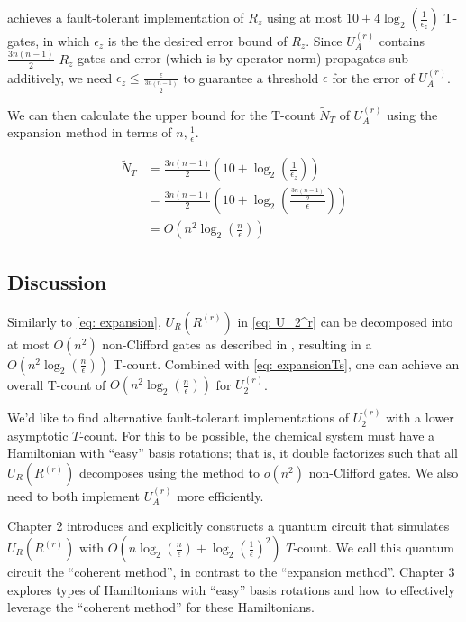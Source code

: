 \cite{Rz} achieves a fault-tolerant implementation of $R_z$ using at most $10 + 4\log_2(\frac{1}{\epsilon_z})$ T-gates, in which $\epsilon_z$ is the the desired error bound of $R_z$. Since $U_A^{(r)}$ contains $\frac{3n(n - 1)}{2}$ $R_z$ gates and error (which is by operator norm) propagates sub-additively, we need $\epsilon_z \leq \frac{\epsilon}{\frac{3n(n - 1)}{2}}$ to guarantee a threshold $\epsilon$ for the error of $U_A^{(r)}$.

We can then calculate the upper bound for the T-count $\tilde{N}_T$ of $U_A^{(r)}$ using the expansion method in terms of $n, \frac{1}{\epsilon}$.

\begin{equation}
    \begin{split}
        \tilde{N}_T &= \frac{3n(n - 1)}{2}(10 + \log_2(\frac{1}{\epsilon_z})) \\
        &= \frac{3n(n - 1)}{2}(10 + \log_2(\frac{\frac{3n(n - 1)}{2}}{\epsilon})) \\
        &= O(n^2\log_2(\frac{n}{\epsilon}))
    \end{split}
    \label{eq: expansionTs}
\end{equation}

\subsection{Discussion}

Similarly to \eqref{eq: expansion}, $U_R(R^{(r)})$ in \eqref{eq: U_2^r} can be decomposed into at most $O(n^2)$ non-Clifford gates as described in \cite{FSN}, resulting in a $O(n^2\log_2(\frac{n}{\epsilon}))$ T-count. Combined with \eqref{eq: expansionTs}, one can achieve an overall T-count of $O(n^2\log_2(\frac{n}{\epsilon}))$ for $U_2^{(r)}$.

We'd like to find alternative fault-tolerant implementations of $U_2^{(r)}$ with a lower asymptotic $T$-count. For this to be possible, the chemical system must have a Hamiltonian with ``easy'' basis rotations; that is, it double factorizes such that all $U_R(R^{(r)})$ decomposes using the \cite{FSN} method to $o(n^2)$ non-Clifford gates. We also need to both implement $U_A^{(r)}$ more efficiently.

Chapter 2 introduces and explicitly constructs a quantum circuit that simulates $U_R(R^{(r)})$ with $O(n\log_2(\frac{n}{\epsilon}) + \log_2(\frac{1}{\epsilon})^2)$ $T$-count. We call this quantum circuit the ``coherent method'', in contrast to the ``expansion method''. Chapter 3 explores types of Hamiltonians with ``easy'' basis rotations and how to effectively leverage the ``coherent method'' for these Hamiltonians.


